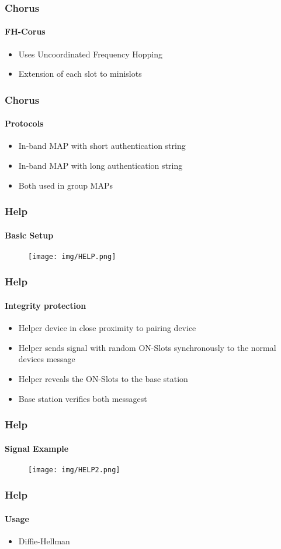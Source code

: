 \documentclass{beamer}
\begin{document}
\begin{frame}
	\frametitle{Chorus}
	\framesubtitle{FH-Corus}
	\begin{itemize}
		\item Uses Uncoordinated Frequency Hopping
		\item Extension of each slot to minislots 
	\end{itemize}
\end{frame}

\begin{frame}
	\frametitle{Chorus}
	\framesubtitle{Protocols}
	\begin{itemize}
		\item In-band MAP with short authentication string
		\item In-band MAP with long authentication string
		\item Both used in group MAPs
	\end{itemize}
\end{frame}

\begin{frame}
	\frametitle{Help}
	\framesubtitle{Basic Setup}
	\begin{figure}
		\texttt{[image: img/HELP.png]}
	\end{figure}
\end{frame}

\begin{frame}
	\frametitle{Help}
	\framesubtitle{Integrity protection}
	\begin{itemize}
		\item Helper device in close proximity to pairing device
		\item Helper sends signal with random ON-Slots synchronously to the normal devices message
		\item Helper reveals the ON-Slots to the base station
		\item Base station verifies both messagest
	\end{itemize}
\end{frame}

\begin{frame}
	\frametitle{Help}
	\framesubtitle{Signal Example}
	\begin{figure}
		\texttt{[image: img/HELP2.png]}
	\end{figure}
\end{frame}

\begin{frame}
	\frametitle{Help}
	\framesubtitle{Usage}
	\begin{itemize}
		\item Diffie-Hellman
	\end{itemize}
\end{frame}
\end{document}
